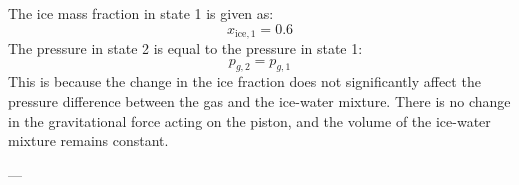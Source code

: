 The ice mass fraction in state 1 is given as:  
\[
x_{\text{ice},1} = 0.6
\]  
The pressure in state 2 is equal to the pressure in state 1:  
\[
p_{g,2} = p_{g,1}
\]  
This is because the change in the ice fraction does not significantly affect the pressure difference between the gas and the ice-water mixture. There is no change in the gravitational force acting on the piston, and the volume of the ice-water mixture remains constant.  

---